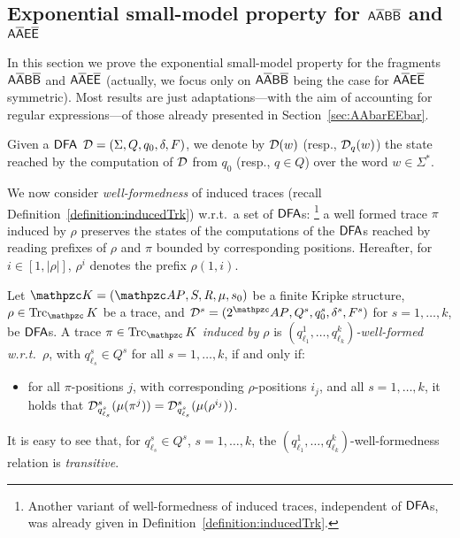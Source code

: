 \subsection{Exponential small-model property for $\mathsf{A\overline{A}B\overline{B}}$ and $\mathsf{A\overline{A}E\overline{E}}$}
\label{subsec:AAbarEEbar}
%
In this section we prove the exponential small-model property for the fragments $\mathsf{A\overline{A}B\overline{B}}$ and $\mathsf{A\overline{A}E\overline{E}}$ 
(actually, we focus only on $\mathsf{A\overline{A}B\overline{B}}$ being the case for $\mathsf{A\overline{A}E\overline{E}}$ symmetric). Most results are just adaptations---with the aim of accounting for regular expressions---of those already presented in Section~\ref{sec:AAbarEEbar}.

Given a $\text{\sffamily DFA}$ $\mathcal{D}=(\Sigma,Q,q_0,\delta,F)$, we denote by $\mathcal{D}(w)$ (resp., $\mathcal{D}_q(w)$) the state reached by the computation of $\mathcal{D}$ from $q_0$ (resp., $q\in Q$) over the word $w\in\Sigma^*$.

We now consider \emph{well-formedness} of induced traces (recall Definition~\ref{definition:inducedTrk}) w.r.t.\ a set of $\text{\sffamily DFA}$s:%
\footnote{Another variant of well-formedness of induced traces, independent of $\text{\sffamily DFA}$s, was already given in Definition~\ref{definition:inducedTrk}.}
a well formed trace $\pi$ induced by $\rho$ preserves the states of the computations of the  $\text{\sffamily DFA}$s reached by reading prefixes of $\rho$ and $\pi$ bounded by corresponding positions.
%
Hereafter, for $i\in [1,|\rho|]$, $\rho^i$ denotes the prefix $\rho(1,i)$.

\begin{definition}
Let $\Ku=\KuDef$ be a finite Kripke structure, $\rho\in\Trk_\Ku$ be a trace, and
$\Du^s=(2^\Prop,Q^s,q_0^s,\delta^s,F^s)$ for $s=1,\ldots ,k$, be $\text{\sffamily DFA}$s.
  A trace $\pi\in\Trk_\Ku$ \emph{induced by} $\rho$ is 
\emph{$(q^1_{\ell_1}, \ldots , q^k_{\ell_k})$-well-formed w.r.t.\ }$\rho$, with $q^s_{\ell_s}\in Q^s$  for all $s=1,\ldots ,k$, if and only if:
\begin{itemize}
     \item for all $\pi$-positions $j$, with corresponding $\rho$-positions $i_j$, and all $s=1,\ldots ,k$, it holds that $\mathcal{D}^s_{q^s_{\ell_s}}(\mu(\pi^{j}))= \mathcal{D}^s_{q^s_{\ell_s}}(\mu(\rho^{i_j}))$.
\end{itemize}
\end{definition}
It is easy to see that, 
for $q^s_{\ell_s}\in Q^s$, $s=1,\ldots ,k$, the $(q^1_{\ell_1}, \ldots , q^k_{\ell_k})$-well-formed\-ness relation is \emph{transitive}.

